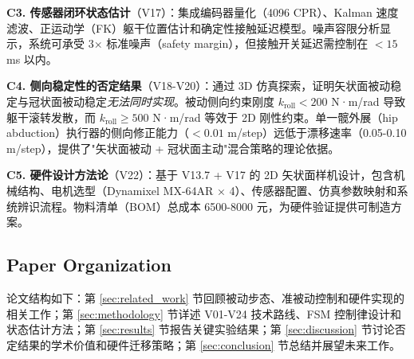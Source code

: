 \textbf{C3. 传感器闭环状态估计}（V17）：集成编码器量化（4096 CPR）、Kalman 速度滤波、正运动学（FK）躯干位置估计和确定性接触延迟模型。噪声容限分析显示，系统可承受 3× 标准噪声（safety margin），但接触开关延迟需控制在 $<15$ ms 以内。

\textbf{C4. 侧向稳定性的否定结果}（V18-V20）：通过 3D 仿真探索，证明矢状面被动稳定与冠状面被动稳定\textit{无法同时实现}。被动侧向约束刚度 $k_{\text{roll}} < 200$ N·m/rad 导致躯干滚转发散，而 $k_{\text{roll}} \geq 500$ N·m/rad 等效于 2D 刚性约束。单一髋外展（hip abduction）执行器的侧向修正能力（$<0.01$ m/step）远低于漂移速率（0.05-0.10 m/step），提供了"矢状面被动 + 冠状面主动"混合策略的理论依据。

\textbf{C5. 硬件设计方法论}（V22）：基于 V13.7 + V17 的 2D 矢状面样机设计，包含机械结构、电机选型（Dynamixel MX-64AR × 4）、传感器配置、仿真参数映射和系统辨识流程。物料清单（BOM）总成本 6500-8000 元，为硬件验证提供可制造方案。

\subsection{Paper Organization}

论文结构如下：第 \ref{sec:related_work} 节回顾被动步态、准被动控制和硬件实现的相关工作；第 \ref{sec:methodology} 节详述 V01-V24 技术路线、FSM 控制律设计和状态估计方法；第 \ref{sec:results} 节报告关键实验结果；第 \ref{sec:discussion} 节讨论否定结果的学术价值和硬件迁移策略；第 \ref{sec:conclusion} 节总结并展望未来工作。
